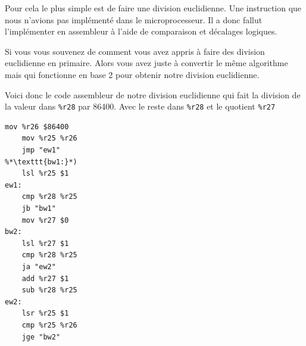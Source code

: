 \documentclass[10pt,a4paper,notitlepage ]{report}
\begin{document}
			Pour cela le plus simple est de faire une division euclidienne. Une instruction que nous n'avions pas implémenté dans le microprocesseur. Il a donc fallut l'implémenter en assembleur à l'aide de comparaison et décalages logiques.

			Si vous vous souvenez de comment vous avez appris à faire des division euclidienne en primaire. Alors vous avez juste à convertir le même algorithme mais qui fonctionne en base 2 pour obtenir notre division euclidienne.

			Voici donc le code assembleur de notre division euclidienne qui fait la division de la valeur dans \texttt{\%r28} par 86400. Avec le reste dans \texttt{\%r28} et le quotient \texttt{\%r27}

\begin{lstlisting}[language={[x86masm]Assembler},morekeywords={lsr}]
	mov %r26 $86400
	mov %r25 %r26
	jmp "ew1"
%*\texttt{bw1:}*)
	lsl %r25 $1
ew1:
	cmp %r28 %r25
	jb "bw1"
	mov %r27 $0
bw2:
	lsl %r27 $1
	cmp %r28 %r25
	ja "ew2"
	add %r27 $1
	sub %r28 %r25
ew2:
	lsr %r25 $1
	cmp %r25 %r26
	jge "bw2"

\end{lstlisting}
\end{document}
